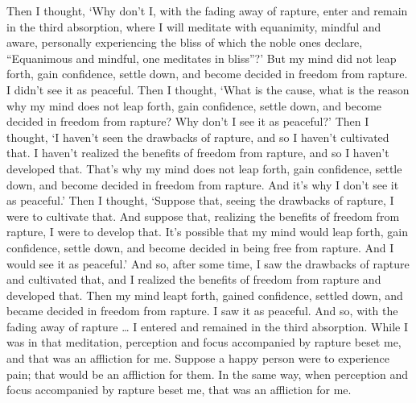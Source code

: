 \documentclass[12pt,openany]{book}%
\begin{document}
Then I thought, ‘Why don’t I, with the fading away of rapture, enter and remain in the third absorption, where I will meditate with equanimity, mindful and aware, personally experiencing the bliss of which the noble ones declare, “Equanimous and mindful, one meditates in bliss”?’ But my mind did not leap forth, gain confidence, settle down, and become decided in freedom from rapture. I didn’t see it as peaceful. Then I thought, ‘What is the cause, what is the reason why my mind does not leap forth, gain confidence, settle down, and become decided in freedom from rapture? Why don’t I see it as peaceful?’ Then I thought, ‘I haven’t seen the drawbacks of rapture, and so I haven’t cultivated that. I haven’t realized the benefits of freedom from rapture, and so I haven’t developed that. That’s why my mind does not leap forth, gain confidence, settle down, and become decided in freedom from rapture. And it’s why I don’t see it as peaceful.’ Then I thought, ‘Suppose that, seeing the drawbacks of rapture, I were to cultivate that. And suppose that, realizing the benefits of freedom from rapture, I were to develop that. It’s possible that my mind would leap forth, gain confidence, settle down, and become decided in being free from rapture. And I would see it as peaceful.’ And so, after some time, I saw the drawbacks of rapture and cultivated that, and I realized the benefits of freedom from rapture and developed that. Then my mind leapt forth, gained confidence, settled down, and became decided in freedom from rapture. I saw it as peaceful. And so, with the fading away of rapture … I entered and remained in the third absorption. While I was in that meditation, perception and focus accompanied by rapture beset me, and that was an affliction for me. Suppose a happy person were to experience pain; that would be an affliction for them. In the same way, when perception and focus accompanied by rapture beset me, that was an affliction for me. 
\end{document}
